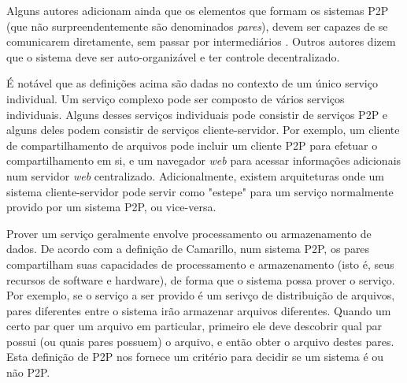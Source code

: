 \documentclass[a4paper]{article}
\begin{document}
Alguns autores adicionam ainda que os elementos que formam os sistemas P2P (que não surpreendentemente são denominados \textit{pares}), devem ser capazes de se comunicarem diretamente, sem passar por intermediários \cite{schollmeier2001}. Outros autores dizem que o sistema deve ser auto-organizável e ter controle decentralizado\cite{roussopoulos2004}.

É notável que as definições acima são dadas no contexto de um único serviço individual. Um serviço complexo pode ser composto de vários serviços individuais. Alguns desses serviços individuais pode consistir de serviços P2P e alguns deles podem consistir de serviços cliente-servidor. Por exemplo, um cliente de compartilhamento de arquivos pode incluir um cliente P2P para efetuar o compartilhamento em si, e um navegador \textit{web} para acessar informações adicionais num servidor \textit{web} centralizado. Adicionalmente, existem arquiteturas onde um sistema cliente-servidor pode servir como "estepe" para um serviço normalmente provido por um sistema P2P, ou vice-versa. \cite{camarillop2parch}

Prover um serviço geralmente envolve processamento ou armazenamento de dados. De acordo com a definição de Camarillo, num sistema P2P, os pares compartilham suas capacidades de processamento e armazenamento (isto é, seus recursos de software e hardware), de forma que o sistema possa prover o serviço. Por exemplo, se o serviço a ser provido é um serivço de distribuição de arquivos, pares diferentes entre o sistema irão armazenar arquivos diferentes. Quando um certo par quer um arquivo em particular, primeiro ele deve descobrir qual par possui (ou quais pares possuem) o arquivo, e então obter o arquivo destes pares\cite{camarillop2parch}. Esta definição de P2P nos fornece um critério para decidir se um sistema é ou não P2P.
\end{document}
